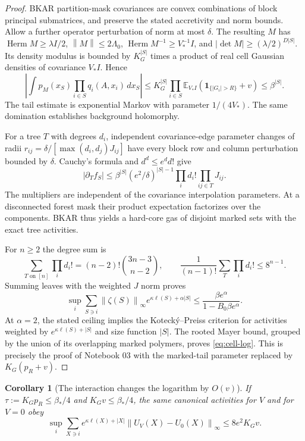\documentclass[11pt]{article}
\newtheorem{corollary}[theorem]{Corollary}
\theoremstyle{remark}
\newcommand{\E}{\mathbb E}
\newcommand{\norm}[1]{\left\|#1\right\|}
\newcommand{\Herm}{\operatorname{Herm}}
\begin{document}
\begin{proof}
BKAR partition-mask covariances are convex combinations of block
principal submatrices, and preserve the stated accretivity and norm
bounds. Allow a further operator perturbation of norm at most $\delta$.
The resulting $M$ has $\Herm M\ge\lambda I/2$, $\norm M\le2\Lambda_0$,
$\Herm M^{-1}\ge V_*^{-1}I$, and
$|\det M|\ge(\lambda/2)^{D|S|}$. Its density modulus is bounded
by $K_G^{|S|}$ times a product of real cell Gaussian densities of
covariance $V_*I$. Hence
\[
 \left|\int p_M(x_S)\prod_{i\in S}q_i(A,x_i)\,dx_S\right|
 \le K_G^{|S|}\prod_{i\in S}
          \E_{V_*I}(\mathbf1_{\{|G_i|>R\}}+v)
 \le\beta^{|S|}.
\]
The tail estimate is exponential Markov with parameter $1/(4V_*)$.
The same domination establishes background holomorphy.

For a tree $T$ with degrees $d_i$, independent covariance-edge
parameter changes of radii
$r_{ij}=\delta/[\max(d_i,d_j)J_{ij}]$ have every block row and
column perturbation bounded by $\delta$. Cauchy's formula and
$d^d\le e^d d!$ give
\[
 |\partial_Tf_S|\le\beta^{|S|}(e^2/\delta)^{|S|-1}
                          \prod_i d_i!\prod_{ij\in T}J_{ij}.
\]
The multipliers are independent of the covariance interpolation
parameters. At a disconnected forest mask their product expectation
factorizes over the components. BKAR thus yields a hard-core gas of
disjoint marked sets with the exact tree activities.

For $n\ge2$ the degree sum is
\[
 \sum_{T\text{ on }[n]}\prod_i d_i!
 =(n-2)!\binom{3n-3}{n-2},\qquad
 \frac{1}{(n-1)!}\sum_T\prod_i d_i!\le8^{n-1}.
\]
Summing leaves with the weighted $J$ norm proves
\[
 \sup_i\sum_{S\ni i}\norm{\zeta(S)}_\infty
             e^{\kappa\ell(S)+\alpha|S|}
 \le\frac{\beta e^\alpha}{1-B_0\beta e^\alpha}.
\]
At $\alpha=2$, the stated ceiling implies the Koteck\'y--Preiss
criterion for activities weighted by $e^{\kappa\ell(S)+|S|}$
and size function $|S|$. The rooted Mayer bound, grouped by the
union of its overlapping marked polymers, proves \eqref{eq:cell-log}.
This is precisely the proof of Notebook 03 with the marked-tail
parameter replaced by $K_G(p_R+v)$.
\end{proof}

\begin{corollary}[The interaction changes the logarithm by $O(v)$]
If $\tau:=K_Gp_R\le\beta_*/4$ and $K_Gv\le\beta_*/4$, the same
canonical activities for $V$ and for $V=0$ obey
\begin{equation}\label{eq:interaction-difference}
 \sup_i\sum_{X\ni i}e^{\kappa\ell(X)+|X|}
       \norm{U_V(X)-U_0(X)}_\infty\le8e^2K_Gv.
\end{equation}
\end{corollary}
\end{document}
